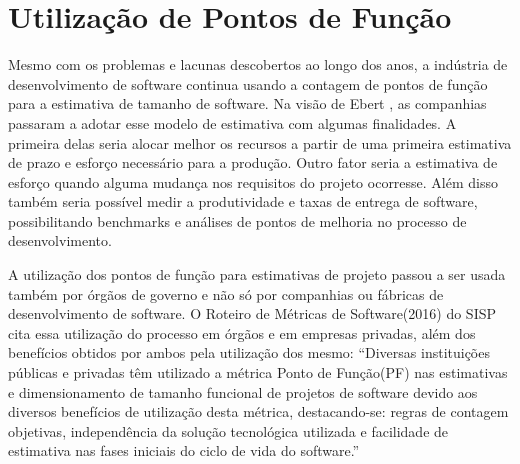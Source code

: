 \section{Utilização de Pontos de Função}

Mesmo com os problemas e lacunas descobertos ao longo dos anos, a indústria de desenvolvimento de software continua usando a contagem de pontos de função para a estimativa de tamanho de software. Na visão de Ebert \cite{Ebert:2014}, as companhias passaram a adotar esse modelo de estimativa com algumas finalidades. A primeira delas seria alocar melhor os recursos a partir de uma primeira estimativa de prazo e esforço necessário para a produção. Outro fator seria a estimativa de esforço quando alguma mudança nos requisitos do projeto ocorresse. Além disso também seria possível medir a produtividade e taxas de entrega de software, possibilitando benchmarks  e análises de pontos de melhoria no processo de desenvolvimento.

A utilização dos pontos de função para estimativas de projeto passou a ser usada também por órgãos de governo e não só por companhias ou fábricas de desenvolvimento de software. O Roteiro de Métricas de Software(2016) do SISP cita essa utilização do processo em órgãos e em empresas privadas, além dos benefícios obtidos por ambos pela utilização dos mesmo:  “Diversas instituições públicas e privadas têm utilizado a métrica Ponto de Função(PF) nas estimativas e dimensionamento de tamanho funcional de projetos de software devido aos diversos benefícios de utilização desta métrica, destacando-se: regras de contagem objetivas, independência da solução tecnológica utilizada e facilidade de estimativa nas fases iniciais do ciclo de vida do software.” \cite{SISP:2016}

